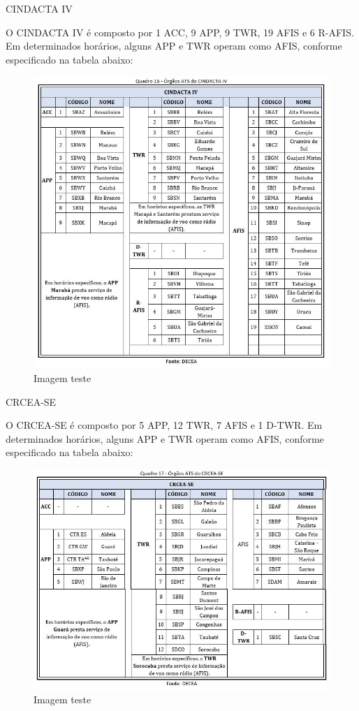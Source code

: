 \documentclass[
]{book}
\begin{document}
CINDACTA IV

O CINDACTA IV é composto por 1 ACC, 9 APP, 9 TWR, 19 AFIS e 6 R-AFIS. Em determinados horários, alguns APP e TWR operam como AFIS, conforme especificado na tabela abaixo:

\begin{figure}
\centering
\includegraphics{imagens/fig94.jpg}
\caption{Imagem teste}
\end{figure}

CRCEA-SE

O CRCEA-SE é composto por 5 APP, 12 TWR, 7 AFIS e 1 D-TWR. Em determinados horários, alguns APP e TWR operam como AFIS, conforme especificado na tabela abaixo:

\begin{figure}
\centering
\includegraphics{imagens/fig95.jpg}
\caption{Imagem teste}
\end{figure}
\end{document}
